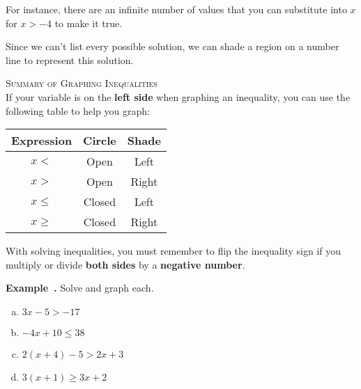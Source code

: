 \documentclass{article}
\newcounter{example}[section]
\newenvironment{example}[1][]{\refstepcounter{example}\par\medskip
   {\color{red}\textbf{Example~\theexample. #1}}}{\medskip}
\begin{document}
For instance, there are an infinite number of values that you can substitute into $x$ for $x > -4$ to make it true. 
\newline 

Since we can't list every possible solution, we can shade a region on a number line to represent this solution.	\newline\\	
\begin{center}
\end{center}
\bigskip 

\textsc{Summary of Graphing Inequalities}   \newline\\
If your variable is on the \textbf{left side} when graphing an inequality, you can use the following table to help you graph:	\newline\\
\begin{center}
\setlength{\extrarowheight}{4pt}
\begin{tabular}{c|c|c}  
\textbf{Expression}	&	\textbf{Circle}	&	\textbf{Shade}	\\
\hline
$x<$					&	Open				& 	Left		\\[4pt]
\hline
$x>$					&	Open				&	Right	\\[4pt]
\hline
$x \leq$				&	Closed			&	Left		\\[4pt]
\hline
$x \geq$				&	Closed			&	Right	\\[4pt]
\end{tabular}
\end{center}
\bigskip 

With solving inequalities, you must remember to flip the inequality sign if you multiply or divide {\color{blue}\textbf{both sides}} by a {\color{orange}\textbf{negative number}}.   \bigskip 

\begin{example}
Solve and graph each.
\begin{multicols}{2}
\begin{enumerate}[(a)]
    \item $3x - 5 > -17$    
    \item $-4x + 10 \leq 38$
\end{enumerate}
\end{multicols}

\vfill 

\begin{multicols}{2}
\begin{enumerate}[(a)]  \setcounter{enumi}{2}
    \item $2(x+4)-5 > 2x + 3$    
    \item $3(x+1) \geq 3x + 2$  
\end{enumerate}
\end{multicols}
\end{example}

\vfill 
\end{document}
